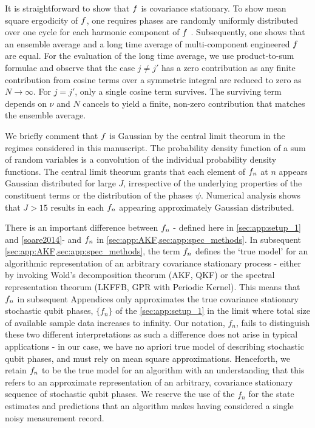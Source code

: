 It is straightforward to show that $f$ is covariance stationary. To show mean square ergodicity of $f$, one requires phases are randomly uniformly distributed over one cycle for each harmonic component of $f$ \cite{gelb1974applied}. Subsequently, one shows that an ensemble average and a long time average of multi-component engineered $f$ are equal. For the evaluation of the long time average, we use product-to-sum formulae and observe that the case $j\neq j'$ has a zero contribution as any finite contribution from cosine terms over a symmetric integral are reduced to zero as $N \rightarrow \infty $.  For $j = j'$, only a single cosine term survives. The surviving term depends on $\nu$ and $N$ cancels to yield a finite, non-zero contribution that matches the ensemble average.

We briefly comment that $f$ is Gaussian by the central limit theorum in the regimes considered in this manuscript. The probability density function of a sum of random variables is a convolution of the individual probability density functions. The central limit theorum grants that each element of $f_n$ at $n$ appears Gaussian distributed for large $J$, irrespective of the underlying properties of the constituent terms or the distribution of the phases $\psi$. Numerical analysis shows that $J > 15$ results in each $f_n$ appearing approximately Gaussian distributed. 

There is an important difference between $f_n$ - defined here in \cref{sec:app:setup_1} and \cref{soare2014}- and $f_n $ in \cref{sec:app:AKF,sec:app:spec_methods}.  In subsequent \cref{sec:app:AKF,sec:app:spec_methods}, the term $f_n $  defines the `true model' for an algorithmic representation of an arbitrary covariance stationary process - either by invoking Wold's decomposition theorum (AKF, QKF) or the spectral representation theorum (LKFFB, GPR with Periodic Kernel). This means that $f_n $ in subsequent Appendices only approximates the true covariance stationary stochastic qubit phases, $\{f_n\}$ of the \cref{sec:app:setup_1} in the limit where total size of available sample data increases to infinity. Our notation, $f_n$, fails to distinguish these two different interpretations as such a difference does not arise in typical applications - in our case, we have no apriori true model of describing stochastic qubit phases, and must rely on mean square approximations. Henceforth, we retain $f_n $ to be the true model for an algorithm with an understanding that this refers to an approximate representation of an arbitrary, covariance stationary sequence of stochastic qubit phases. We reserve the use of the $\hat{f_n}$ for the state estimates and predictions that an algorithm makes having considered a single noisy measurement record. 


